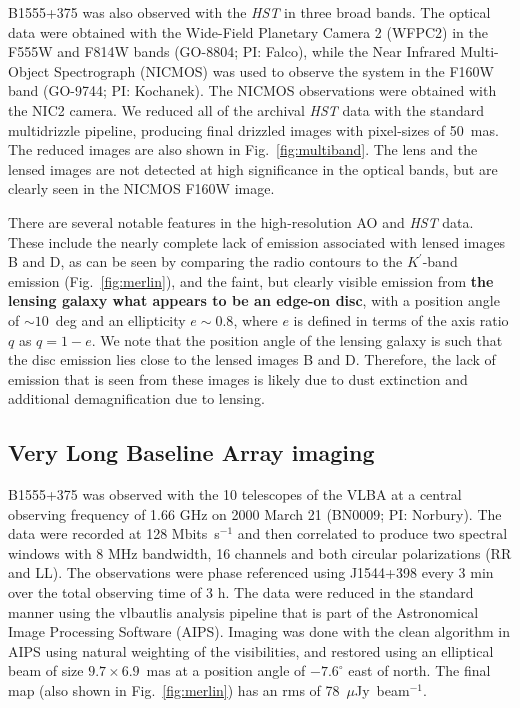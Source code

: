 \documentclass[a4paper,fleqn,usenatbib,useAMS]{mnras}
\begin{document}
B1555+375 was also observed with the {\it HST} in three broad bands.  The optical data were obtained with the Wide-Field Planetary Camera 2 (WFPC2) in the F555W and F814W bands (GO-8804; PI: Falco), while the Near Infrared Multi-Object Spectrograph (NICMOS) was used to observe the system in the F160W band (GO-9744; PI: Kochanek).  The NICMOS observations were obtained with the NIC2 camera.  We reduced all of the archival \textit{HST} data with the standard {\sc multidrizzle} pipeline, producing final drizzled images with pixel-sizes of 50~mas. The reduced images are also shown in Fig.~\ref{fig:multiband}. The lens and the lensed images are not detected at high significance in the optical bands, but are clearly seen in the NICMOS F160W image.

There are several notable features in the high-resolution AO and {\it HST} data. These include the nearly complete lack of emission associated with lensed images B and D, as can be seen by comparing the radio contours to the $K^\prime$-band emission  (Fig.~\ref{fig:merlin}), and the faint, but clearly visible emission from {\bf the lensing galaxy what appears to be an edge-on disc}, with a position angle of $\sim 10$~deg and an ellipticity $e \sim 0.8$, where $e$ is defined in terms of the axis ratio $q$ as $q=1-e$.  We note that the position angle of the lensing galaxy is such that the disc emission lies close to the lensed images B and D. Therefore, the lack of emission that is seen from these images is likely due to dust extinction and additional demagnification due to lensing. 

\subsection{Very Long Baseline Array imaging}

B1555+375 was observed with the 10 telescopes of the VLBA at a central observing frequency of 1.66 GHz on 2000 March 21 (BN0009; PI: Norbury). The data were recorded at 128 Mbits~s$^{-1}$ and then correlated to produce two spectral windows with 8 MHz bandwidth, 16 channels and both circular polarizations (RR and LL). The observations were phase referenced using J1544+398 every 3 min over the total observing time of 3 h. The data were reduced in the standard manner using the {\sc vlbautlis} analysis pipeline that is part of the Astronomical Image Processing Software (AIPS). Imaging was done with the {\sc clean} algorithm in AIPS using natural weighting of the visibilities, and restored using an elliptical beam of size $9.7 \times 6.9$~mas at a position angle of $-7.6^\circ$ east of north. The final map (also shown in Fig.~\ref{fig:merlin}) has an rms of 78~$\mu$Jy~beam$^{-1}$.
\end{document}

